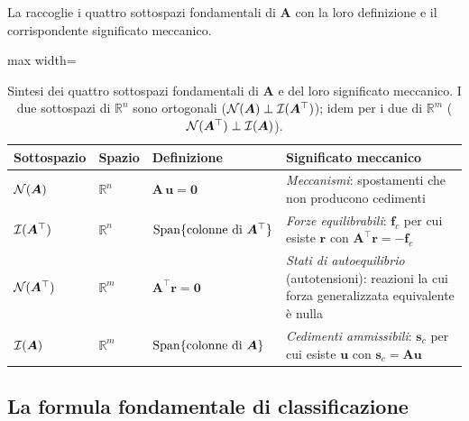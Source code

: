 \medskip

La  raccoglie i quattro sottospazi
fondamentali di $\bm{A}$  con la loro definizione e il
corrispondente significato meccanico.

\begin{table}[htbp]
	\centering
	\renewcommand{\arraystretch}{2.0}
	\small
	\begin{adjustbox}{max width=\textwidth}
		\begin{tabular}{
				>{\bfseries}p{3.4cm}
				p{1.5cm}
				p{4.2cm}
				p{4.3cm}}
			\toprule
			Sottospazio
			& Spazio
			& Definizione
			& Significato meccanico\\
			\midrule
			$\mathcal{N}(\bm{A})$
			& $\mathbb{R}^{n}$
			& $\bm{A}\,\bm{u} = \bm{0}$
			& \emph{Meccanismi}: spostamenti che non producono
			cedimenti\\
			$\mathcal{I}(\bm{A}^{\top})$
			& $\mathbb{R}^{n}$
			& $\operatorname{Span}\{\text{colonne di }\bm{A}^{\top}\}$
			& \emph{Forze equilibrabili}: $\bm{f}_c$ per cui esiste
			$\bm{r}$ con $\bm{A}^\top\bm{r}=-\bm{f}_c$\\
			\midrule
			$\mathcal{N}(\bm{A}^{\top})$
			& $\mathbb{R}^{m}$
			& $\bm{A}^{\top}\bm{r} = \bm{0}$
			& \emph{Stati di autoequilibrio} (autotensioni): reazioni
			la cui forza generalizzata equivalente è nulla\\
			$\mathcal{I}(\bm{A})$
			& $\mathbb{R}^{m}$
			& $\operatorname{Span}\{\text{colonne di }\bm{A}\}$
			& \emph{Cedimenti ammissibili}: $\bm{s}_c$ per cui esiste
			$\bm{u}$ con $\bm{s}_c=\bm{A}\bm{u}$\\
			\bottomrule
		\end{tabular}
	\end{adjustbox}
	\caption{Sintesi dei quattro sottospazi fondamentali di $\bm{A}$
		e del loro significato meccanico.
		I due sottospazi di $\mathbb{R}^{n}$ sono ortogonali
		($\mathcal{N}(\bm{A}) \perp \mathcal{I}(\bm{A}^{\top})$);
		idem per i due di $\mathbb{R}^{m}$
		($\mathcal{N}(\bm{A}^\top) \perp \mathcal{I}(\bm{A})$).}
	\label{tab:quattro_sottospazi}
\end{table}

\subsection{La formula fondamentale di classificazione}
\label{sec:classificazione}

